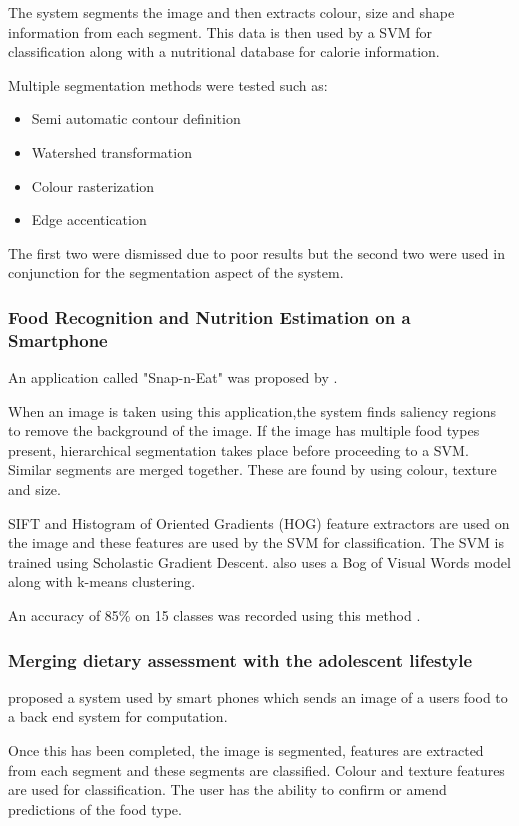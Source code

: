 The system segments the image and then extracts colour, size and shape information from each segment. This data is then used by a SVM for classification along with a nutritional database for calorie information. 

Multiple segmentation methods were tested such as:
\begin{itemize}
	\item{Semi automatic contour definition}
	\item{Watershed transformation}
	\item{Colour rasterization}
	\item{Edge accentication}
\end{itemize}
The first two were dismissed due to poor results but the second two were used in conjunction for the segmentation aspect of the system.

\subsubsection*{Food Recognition and Nutrition Estimation on a Smartphone}
An application called "Snap-n-Eat" was proposed by \textcite{snap}.

When an image is taken using this application,the system finds saliency regions to remove the background of the image.
If the image has multiple food types present, hierarchical segmentation takes place before proceeding to a SVM. Similar segments are merged together.
These are found by using colour, texture and size.

SIFT and Histogram of Oriented Gradients (HOG) feature extractors are used on the image and these features are used by the SVM for classification.
The SVM is trained using Scholastic Gradient Descent.
\textcite{snap} also uses a Bog of Visual Words model along with k-means clustering.

An accuracy of 85\% on 15 classes was recorded using this method \textcite{snap}.

\subsubsection*{Merging dietary assessment with the adolescent lifestyle}
\textcite{schap2014merging} proposed a system used by smart phones which sends an image of a users food to a back end system for computation.

Once this has been completed, the image is segmented, features are extracted from each segment and these segments are classified.
Colour and texture features are used for classification.
The user has the ability to confirm or amend predictions of the food type.

